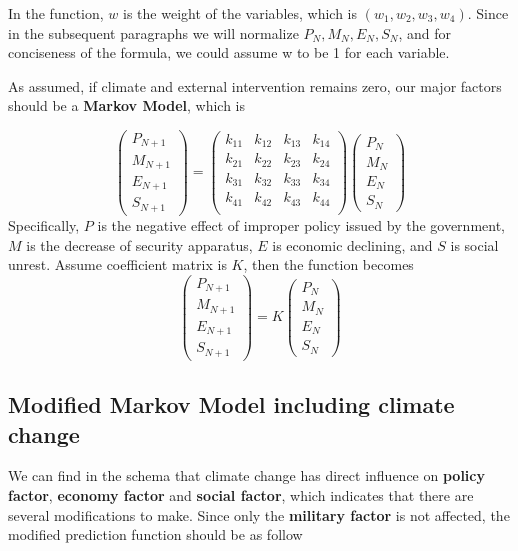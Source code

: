 \documentclass{mcmthesis}
\begin{document}
In the function, $w$ is the weight of the variables, which is $(w_1, w_2, w_3, w_4)$. Since in the subsequent paragraphs we will normalize $P_N, M_N, E_N, S_N$, and for conciseness of the formula, we could assume w to be 1 for each variable.

As assumed, if climate and external intervention remains zero, our major factors should be a \textbf{Markov Model}, which is

$$
\left(
\begin{matrix}
	P_{N+1} \\ M_{N+1} \\ E_{N+1} \\ S_{N+1}
\end{matrix}
\right) 
= 
\left(
\begin{matrix}
k_{11} & k_{12} & k_{13} & k_{14} \\
k_{21} & k_{22} & k_{23} & k_{24} \\
k_{31} & k_{32} & k_{33} & k_{34} \\
k_{41} & k_{42} & k_{43} & k_{44} \\
\end{matrix}
\right) 
\left(
\begin{matrix}
P_N \\ M_N \\ E_N \\ S_N
\end{matrix}
\right) 
$$
Specifically, $P$ is the negative effect of improper policy issued by the government, $M$ is the decrease of security apparatus, $E$ is economic declining, and $S$ is social unrest. Assume coefficient matrix is $K$, then the function becomes
$$
\left(
\begin{matrix}
P_{N+1} \\ M_{N+1} \\ E_{N+1} \\ S_{N+1}
\end{matrix}
\right) 
= 
K
\left(
\begin{matrix}
P_N \\ M_N \\ E_N \\ S_N
\end{matrix}
\right) 
$$

\subsection{Modified Markov Model including climate change}

We can find in the schema that climate change has direct influence on \textbf{policy factor}, \textbf{economy factor} and \textbf{social factor}, which indicates that there are several modifications to make. Since only the \textbf{military factor} is not affected, the modified prediction function should be as follow
\end{document}
